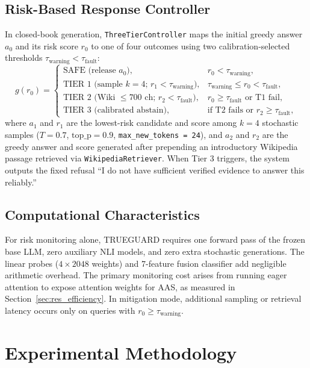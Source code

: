 \documentclass{ieeeaccess}
\begin{document}
\subsection{Risk-Based Response Controller}
In closed-book generation, \texttt{ThreeTierController} maps the initial greedy answer $a_0$ and its risk score $r_0$ to one of four outcomes using two calibration-selected thresholds $\tau_{\text{warning}} < \tau_{\text{fault}}$:
\begin{equation}
g(r_0) = \begin{cases}
\text{SAFE (release } a_0\text{)}, & r_0 < \tau_{\text{warning}}, \\
\text{TIER 1 (sample } k{=}4\text{; } r_1 < \tau_{\text{warning}}\text{)}, & \tau_{\text{warning}} \le r_0 < \tau_{\text{fault}}, \\
\text{TIER 2 (Wiki } \le 700\text{ ch; } r_2 < \tau_{\text{fault}}\text{)}, & r_0 \ge \tau_{\text{fault}} \text{ or T1 fail}, \\
\text{TIER 3 (calibrated abstain)}, & \text{if T2 fails or } r_2 \ge \tau_{\text{fault}},
\end{cases}
\label{eq:controller}
\end{equation}
where $a_1$ and $r_1$ are the lowest-risk candidate and score among $k = 4$ stochastic samples ($T = 0.7$, $\text{top\_p} = 0.9$, \texttt{max\_new\_tokens = 24}), and $a_2$ and $r_2$ are the greedy answer and score generated after prepending an introductory Wikipedia passage retrieved via \texttt{WikipediaRetriever}. When Tier 3 triggers, the system outputs the fixed refusal ``I do not have sufficient verified evidence to answer this reliably.''

\subsection{Computational Characteristics}
For risk monitoring alone, TRUEGUARD requires one forward pass of the frozen base LLM, zero auxiliary NLI models, and zero extra stochastic generations. The linear probes ($4 \times 2048$ weights) and 7-feature fusion classifier add negligible arithmetic overhead. The primary monitoring cost arises from running eager attention to expose attention weights for AAS, as measured in Section~\ref{sec:res_efficiency}. In mitigation mode, additional sampling or retrieval latency occurs only on queries with $r_0 \ge \tau_{\text{warning}}$.

\section{Experimental Methodology}
\label{sec:methodology}
\end{document}

